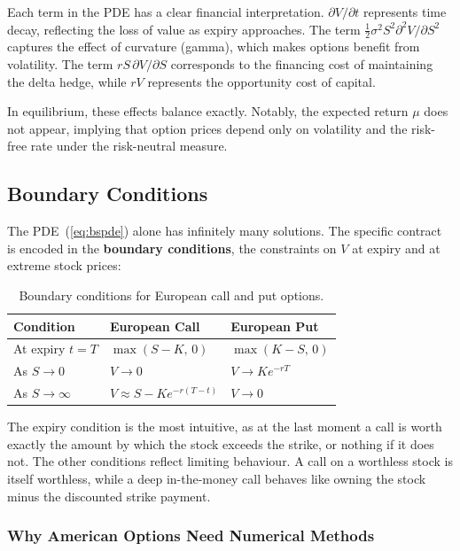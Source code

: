 \documentclass[12pt]{article}
\begin{document}
Each term in the PDE has a clear financial interpretation. 
$\partial V/\partial t$ represents time decay, reflecting the loss of value as expiry approaches. 
The term $\frac{1}{2}\sigma^2 S^2 \partial^2 V/\partial S^2$ captures the effect of curvature (gamma), which makes options benefit from volatility. 
The term $rS\,\partial V/\partial S$ corresponds to the financing cost of maintaining the delta hedge, while $rV$ represents the opportunity cost of capital.

In equilibrium, these effects balance exactly. Notably, the expected return $\mu$ does not appear, implying that option prices depend only on volatility and the risk-free rate under the risk-neutral measure.


\subsection{Boundary Conditions}

The PDE~(\ref{eq:bspde}) alone has infinitely many solutions. The specific contract
is encoded in the \textbf{boundary conditions}, the constraints on $V$ at expiry and
at extreme stock prices:

\begin{table}[H]
  \centering
  \caption{Boundary conditions for European call and put options.}
  \label{tab:bc}
  \begin{tabular}{L{4cm} C{4.5cm} C{4.5cm}}
    \toprule
    \textbf{Condition} & \textbf{European Call} & \textbf{European Put} \\
    \midrule
    At expiry $t = T$  & $\max(S - K,\, 0)$ & $\max(K - S,\, 0)$ \\
    As $S \to 0$       & $V \to 0$           & $V \to K e^{-rT}$  \\
    As $S \to \infty$  & $V \approx S - Ke^{-r(T-t)}$ & $V \to 0$ \\
    \bottomrule
  \end{tabular}
\end{table}

The expiry condition is the most intuitive, as at the last moment a call is worth exactly the amount by which the stock exceeds the strike, or nothing if it does not. The other conditions reflect limiting behaviour. A call on a worthless stock is itself worthless, while a deep in-the-money call behaves like owning the stock minus the discounted strike payment.

\subsubsection{Why American Options Need Numerical Methods}
\end{document}
